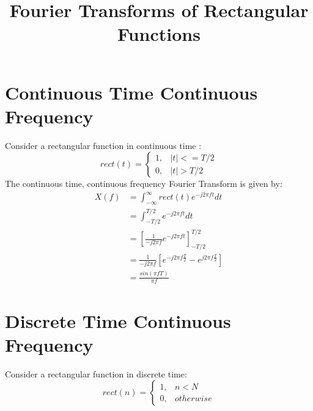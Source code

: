 \documentclass{article}
\begin{document}
\title{Fourier Transforms of Rectangular Functions}
\maketitle

\section{Continuous Time Continuous Frequency}

Consider a rectangular function in continuous time \cite{wikipedia_rect}:
\begin{equation}
rect(t)= 
	\begin{cases}
      1, & |t| <= T/2 \\
      0, & |t| > T/2
	\end{cases}
\end{equation}
The continuous time, continuous frequency Fourier Transform is given by:
\begin{equation} \label{eq:ctcf}
\begin{split}
X(f) &= \int_{-\infty}^{\infty} rect(t)e^{-j2 \pi ft} dt\\
     &= \int_{-T/2}^{T/2} e^{-j 2 \pi ft} dt \\
     &= \left[ \frac{1}{-j 2 \pi f} e^{-j 2 \pi ft} \right]_{-T/2}^{T/2} \\
     &= \frac{1}{-j 2 \pi f} \left[  e^{-j 2 \pi f \frac{T}{2}} - e^{j 2 \pi f \frac{T}{2}} \right] \\
     &= \frac{sin(\pi f T)}{\pi f}
\end{split}
\end{equation}

\section{Discrete Time Continuous Frequency}

Consider a rectangular function in discrete time:
\begin{equation}
rect(n)= 
	\begin{cases}
      1, & n < N \\
      0, & otherwise
	\end{cases}
\end{equation}
\end{document}
